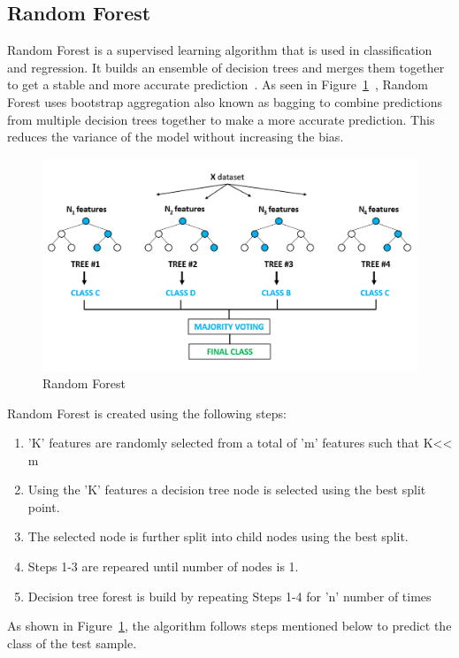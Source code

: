 \subsection{Random Forest}

Random Forest is a supervised learning algorithm that is used in classification and regression. It builds an ensemble of decision trees and merges them together to get a stable and more accurate prediction~\cite{Tin95}. As seen in Figure~\ref{fig:random_forest}~\cite{RandomForest}, Random Forest uses bootstrap aggregation also known as bagging to combine predictions from multiple decision trees together to make a more accurate prediction. This reduces the variance of the model without increasing the bias.

\begin{figure}[htb]
	\centering
	\includegraphics[width=1\textwidth]{images/random_forest.png}
	\caption{Random Forest} 
	\label{fig:random_forest}
\end{figure}

Random Forest is created using the following steps:
\begin{enumerate}
	\item 'K' features are randomly selected from a total of 'm' features such that K<< m
	\item Using the 'K' features a decision tree node is selected using the best split point.
	\item The selected node is further split into child nodes using the best split.
	\item Steps 1-3 are repeared until number of nodes is 1.
	\item Decision tree forest is build by repeating Steps 1-4 for 'n' number of times 
\end{enumerate}

As shown in Figure~\ref{fig:random_forest}, the algorithm follows steps mentioned below to predict the class of the test sample.

